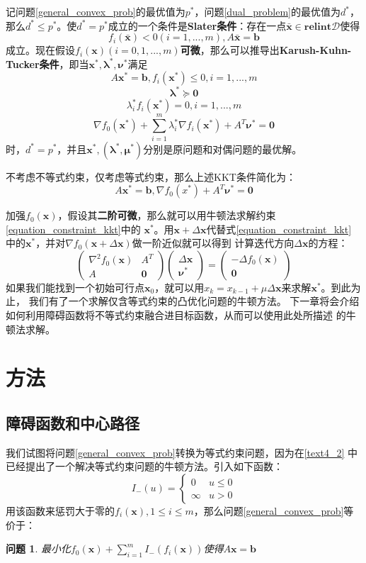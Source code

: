 \documentclass{article}
\newtheorem{problem}{问题}
\begin{document}
记问题\ref{general_convex_prob}的最优值为$p^*$，问题\ref{dual_problem}的最优值为$d^*$，
那么$d^*\le p^*$。使$d^*=p^*$成立的一个条件是\textbf{Slater条件}：存在一点$\bar{\bm x}\in \textbf{relint}\mathcal D$使得
$$f_i(\bar{\bm x})<0(i=1,...,m),A\bar{\bm x}=\bm b$$
成立。现在假设$f_i(\bm x)(i=0,1,...,m)$\textbf{可微}，那么可以推导出\textbf{Karush-Kuhn-Tucker条件}，即当$\bm x^*,\bm\lambda^*,\bm\nu^*$满足
$$A\bm x^*=\bm b,f_i(\bm x^*)\le 0,i=1,...,m$$
$$\bm\lambda^*\succeq \bm 0$$
$$\lambda^*_if_i(\bm x^*)=0,i=1,...,m$$
$$\nabla f_0(\bm x^*)+\sum_{i=1}^m{\lambda^*_i}\nabla f_i(\bm x^*)+A^T\bm\nu^*=\bm 0$$
时，$d^*=p^*$，并且$\bm x^*,(\bm\lambda^*,\bm\mu^*)$分别是原问题和对偶问题的最优解。

不考虑不等式约束，仅考虑等式约束，那么上述KKT条件简化为：
\begin{equation}
    A\bm x^*=\bm b,\nabla f_0(x^*)+A^T\bm\nu ^*=\bm 0\label{equation_constraint_kkt}
\end{equation}

加强$f_0(\bm x)$，假设其\textbf{二阶可微}，那么就可以用牛顿法求解约束\eqref{equation_constraint_kkt}中的
$\bm x^*$。用$\bm x+\Delta \bm x$代替式\eqref{equation_constraint_kkt}
中的$\bm x^*$，并对$\nabla f_0(\bm x+\Delta \bm x)$做一阶近似就可以得到
计算迭代方向$\Delta \bm x$的方程：
\begin{equation}
\begin{pmatrix}
    \nabla^2f_0(\bm x) & A^T\\
    A & \bm 0
\end{pmatrix}
\begin{pmatrix}
    \Delta \bm x\\
    \bm\nu^*
\end{pmatrix}=
\begin{pmatrix}
    -\Delta f_0(\bm x)\\
    \bm 0
\end{pmatrix}\label{newton_for_equation}\end{equation}
如果我们能找到一个初始可行点$\bm x_0$，就可以用$x_k=x_{k-1}+\mu \Delta \bm x$来求解$\bm x^*$。到此为止，
我们有了一个求解仅含等式约束的凸优化问题的牛顿方法。
下一章将会介绍如何利用障碍函数将不等式约束融合进目标函数，从而可以使用此处所描述
的牛顿法求解。
\label{text4_2}
\section{方法}
\subsection{障碍函数和中心路径}
我们试图将问题\ref{general_convex_prob}转换为等式约束问题，因为在\ref{text4_2}
中已经提出了一个解决等式约束问题的牛顿方法。引入如下函数：
$$I_-(u)=\begin{cases}
    0 & u\le 0 \\
    \infty & u > 0
\end{cases}$$
用该函数来惩罚大于零的$f_i(\bm x),1\le i\le m$，那么问题\ref{general_convex_prob}等价于：
\begin{problem}
最小化$f_0(\bm x)+\sum_{i=1}^m{I_-(f_i(\bm x))}$使得$A\bm x=\bm b$
\label{barrier_problem}
\end{problem}
\end{document}
